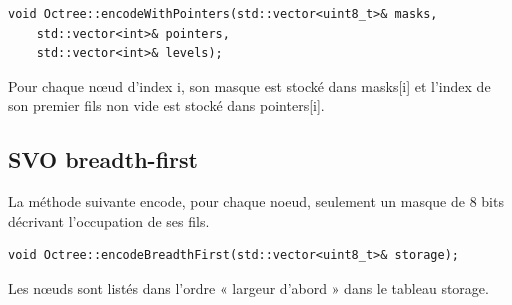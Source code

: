\documentclass[a4paper]{article}
\begin{document}
\begin{lstlisting}
void Octree::encodeWithPointers(std::vector<uint8_t>& masks, 
	std::vector<int>& pointers, 
	std::vector<int>& levels);
\end{lstlisting}

Pour chaque nœud d'index i, son masque est stocké dans masks[i] et l’index de son premier fils non vide est stocké dans pointers[i].

\subsection{SVO breadth-first}

La méthode suivante encode, pour chaque noeud, seulement un masque de 8 bits décrivant l’occupation de ses fils.

\begin{lstlisting}
void Octree::encodeBreadthFirst(std::vector<uint8_t>& storage);
\end{lstlisting}
 
Les nœuds sont listés dans l’ordre « largeur d’abord » dans le tableau storage.
\end{document}
